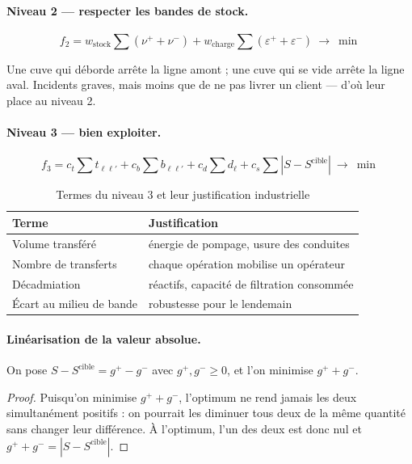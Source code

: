 \paragraph{Niveau 2 --- respecter les bandes de stock.}
\begin{equation}
f_2 = w_{\mathrm{stock}} \sum \left(\nu^{+} + \nu^{-}\right)
    + w_{\mathrm{charge}} \sum \left(\varepsilon^{+} + \varepsilon^{-}\right)
\ \longrightarrow\ \min
\end{equation}

Une cuve qui déborde arrête la ligne amont ; une cuve qui se vide arrête la ligne aval.
Incidents graves, mais moins que de ne pas livrer un client --- d'où leur place au niveau 2.

\paragraph{Niveau 3 --- bien exploiter.}
\begin{equation}
f_3 = c_t \sum t_{\ell\ell'} + c_b \sum b_{\ell\ell'} + c_d \sum d_\ell
    + c_s \sum \left| S - S^{\mathrm{cible}} \right|
\ \longrightarrow\ \min
\end{equation}

\begin{table}[H]
\centering
\caption{Termes du niveau 3 et leur justification industrielle}
\label{tab:niveau3}
\begin{tabular}{@{}lp{8cm}@{}}
\toprule
\textbf{Terme} & \textbf{Justification} \\
\midrule
Volume transféré & énergie de pompage, usure des conduites \\
Nombre de transferts & chaque opération mobilise un opérateur \\
Décadmiation & réactifs, capacité de filtration consommée \\
Écart au milieu de bande & robustesse pour le lendemain \\
\bottomrule
\end{tabular}
\end{table}

\paragraph{Linéarisation de la valeur absolue.}
On pose $S - S^{\mathrm{cible}} = g^{+} - g^{-}$ avec $g^{+}, g^{-} \ge 0$, et l'on minimise
$g^{+} + g^{-}$.

\begin{proof}
Puisqu'on minimise $g^{+} + g^{-}$, l'optimum ne rend jamais les deux simultanément
positifs : on pourrait les diminuer tous deux de la même quantité sans changer leur
différence. À l'optimum, l'un des deux est donc nul et
$g^{+} + g^{-} = |S - S^{\mathrm{cible}}|$.
\end{proof}

